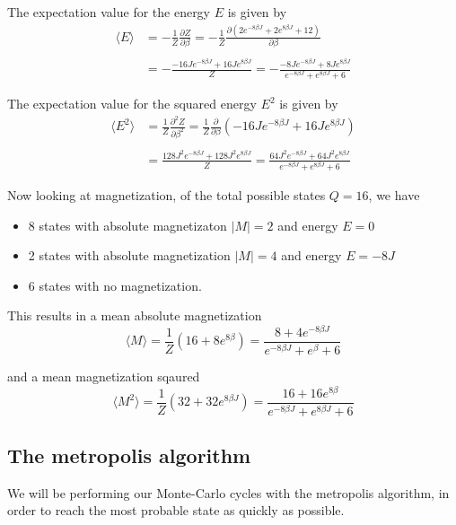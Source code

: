 \documentclass[10pt,a4paper]{article}
\begin{document}
The expectation value for the energy $E$ is given by
\begin{equation}\begin{split}
\langle E \rangle &= -\frac{1}{Z}\frac{\partial Z}{\partial\beta} = -\frac{1}{Z} \frac{\partial (2e^{-8\beta J} + 2e^{8\beta J} + 12)}{\partial \beta}\\\\
&= -\frac{-16Je^{-8\beta J} + 16Je^{8\beta J}}{Z} = -\frac{-8Je^{-8\beta J} + 8Je^{8\beta J}}{e^{-8\beta J} + e^{8\beta J} + 6}
\end{split}\end{equation}

The expectation value for the squared energy $E^2$ is given by
\begin{equation}\begin{split}
\langle E^2 \rangle &= \frac{1}{Z}\frac{\partial^2 Z}{\partial\beta^2} = \frac{1}{Z}\frac{\partial}{\partial\beta}\left(-16Je^{-8\beta J} + 16Je^{8\beta J} \right)\\\\
&= \frac{128J^2e^{-8\beta J} + 128J^2e^{8\beta J}}{Z} = \frac{64J^2e^{-8\beta J} + 64J^2e^{8\beta J}}{e^{-8\beta J}+e^{8\beta J} + 6}
\end{split}\end{equation}



Now looking at magnetization, of the total possible states $Q = 16$, we have
\begin{itemize}
\item 8 states with absolute magnetizaton $|M| = 2$ and energy $E = 0$
\item 2 states with absolute magnetization $|M| = 4$ and energy $E = -8J$
\item 6 states with no magnetization.
\end{itemize}
This results in a mean absolute magnetization
\begin{equation}
\langle M \rangle = \frac{1}{Z} (16+8e^{8\beta}) = \frac{8+4e^{-8\beta J}}{e^{-8\beta J} + e^{\beta} + 6}
\end{equation}

and a mean magnetization sqaured
\begin{equation}
\langle M^2 \rangle = \frac{1}{Z} (32+32e^{8\beta J}) = \frac{16 + 16e^{8\beta}}{e^{-8\beta J} + e^{8\beta J} + 6}
\end{equation}



\subsection{The metropolis algorithm}
We will be performing our Monte-Carlo cycles with the metropolis algorithm, in order to reach the most probable state as quickly as possible.
\end{document}
